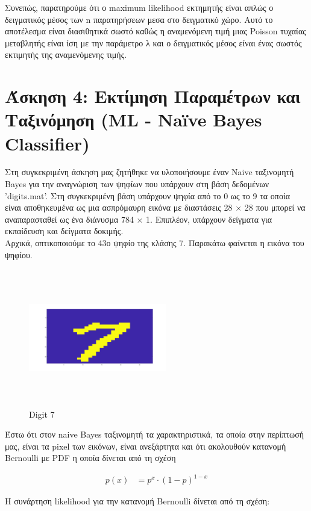 \documentclass{article}
\begin{document}
	\noindent
	Συνεπώς, παρατηρούμε ότι ο maximum likelihood εκτημητής είναι απλώς ο δειγματικός μέσος των n παρατηρήσεων μεσα στο δειγματικό χώρο. Αυτό το αποτέλεσμα είναι διασιθητικά σωστό καθώς η αναμενόμενη τιμή μιας Poisson τυχαίας μεταβλητής είναι ίση με την παράμετρο λ και ο δειγματικός μέσος είναι ένας σωστός εκτιμητής της αναμενόμενης τιμής.
	
\section*{Άσκηση 4: Εκτίμηση Παραμέτρων και Ταξινόμηση (ΜL - Naïve Bayes Classifier)}	
	Στη συγκεκριμένη άσκηση μας ζητήθηκε να υλοποιήσουμε έναν Naive ταξινομητή Bayes για την αναγνώριση των ψηφίων που υπάρχουν στη βάση δεδομένων 'digits.mat'. Στη συγκεκριμένη βάση υπάρχουν ψηφία από το 0 ως το 9 τα οποία είναι αποθηκευμένα ως μια ασπρόμαυρη εικόνα με διαστάσεις 28 $\times$ 28 που μπορεί να αναπαρασταθεί ως ένα διάνυσμα 784 $\times$ 1. Eπιπλέον, υπάρχουν δείγματα για εκπαίδευση και δείγματα δοκιμής. \\
	
	Αρχικά, οπτικοποιούμε το 43ο ψηφίο της κλάσης 7. Παρακάτω φαίνεται η εικόνα του ψηφίου.
	
	 \begin{figure}[h!]
	 	\centering
	 	\includegraphics[height=6cm,width=6cm]{../exercise2_4/images/ex4_digit_7.png}
	 	\caption{Digit 7}
	 \end{figure}
	
	\noindent
	Έστω ότι στον naive Bayes ταξινομητή τα χαρακτηριστικά, τα οποία στην περίπτωσή μας, είναι τα pixel των εικόνων, είναι ανεξάρτητα και ότι ακολουθούν κατανομή Bernoulli με PDF η οποία δίνεται από τη σχέση
	
	\begin{align*}
		p(x) &= p^{x} \cdot (1-p)^{1-x}
	\end{align*}
	
	\noindent
	Η συνάρτηση likelihood για την κατανομή Βernoulli δίνεται από τη σχέση:
	
\end{document}
